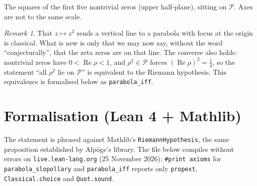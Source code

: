 \documentclass[11pt,a4paper]{article}
\theoremstyle{remark}\newtheorem*{remark}{Remark}
\begin{document}
\begin{center}

\small The squares of the first five nontrivial zeros (upper half-plane), sitting on
$\mathcal{P}$. Axes are not to the same scale.
\end{center}

\begin{remark}
That $z\mapsto z^{2}$ sends a vertical line to a parabola with focus at the
origin is classical. What is new is only that we may now say, without the word
``conjecturally'', that the zeta zeros are on that line. The converse also
holds: nontrivial zeros have $0<\operatorname{Re}\rho<1$, and
$\rho^{2}\in\mathcal{P}$ forces $(\operatorname{Re}\rho)^{2}=\tfrac14$, so the
statement ``all $\rho^{2}$ lie on $\mathcal{P}$'' is equivalent to the Riemann
hypothesis. This equivalence is formalised below as \texttt{parabola\_iff}.
\end{remark}

\section*{Formalisation (Lean 4 + Mathlib)}
The statement is phrased against Mathlib's \texttt{RiemannHypothesis}, the same
proposition established by Alp\"oge's library. The file below compiles without errors on \texttt{live.lean-lang.org} (25 November 2026); \texttt{\#print axioms} for \texttt{parabola\_slopollary} and \texttt{parabola\_iff} reports only \texttt{propext}, \texttt{Classical.choice} and \texttt{Quot.sound}.
\end{document}
